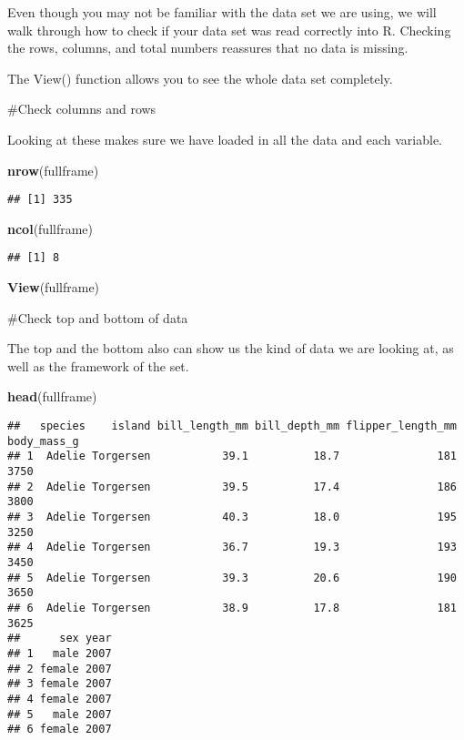 \documentclass[
]{article}
\newenvironment{Shaded}{\begin{snugshade}}{\end{snugshade}}
\newcommand{\FunctionTok}[1]{\textcolor[rgb]{0.13,0.29,0.53}{\textbf{#1}}}
\newcommand{\NormalTok}[1]{#1}
\begin{document}
Even though you may not be familiar with the data set we are using, we
will walk through how to check if your data set was read correctly into
R. Checking the rows, columns, and total numbers reassures that no data
is missing.

The View() function allows you to see the whole data set completely.

\#Check columns and rows

Looking at these makes sure we have loaded in all the data and each
variable.

\begin{Shaded}
\begin{Highlighting}[]
\FunctionTok{nrow}\NormalTok{(fullframe)}
\end{Highlighting}
\end{Shaded}

\begin{verbatim}
## [1] 335
\end{verbatim}

\begin{Shaded}
\begin{Highlighting}[]
\FunctionTok{ncol}\NormalTok{(fullframe)}
\end{Highlighting}
\end{Shaded}

\begin{verbatim}
## [1] 8
\end{verbatim}

\begin{Shaded}
\begin{Highlighting}[]
\FunctionTok{View}\NormalTok{(fullframe)}
\end{Highlighting}
\end{Shaded}

\#Check top and bottom of data

The top and the bottom also can show us the kind of data we are looking
at, as well as the framework of the set.

\begin{Shaded}
\begin{Highlighting}[]
\FunctionTok{head}\NormalTok{(fullframe)}
\end{Highlighting}
\end{Shaded}

\begin{verbatim}
##   species    island bill_length_mm bill_depth_mm flipper_length_mm body_mass_g
## 1  Adelie Torgersen           39.1          18.7               181        3750
## 2  Adelie Torgersen           39.5          17.4               186        3800
## 3  Adelie Torgersen           40.3          18.0               195        3250
## 4  Adelie Torgersen           36.7          19.3               193        3450
## 5  Adelie Torgersen           39.3          20.6               190        3650
## 6  Adelie Torgersen           38.9          17.8               181        3625
##      sex year
## 1   male 2007
## 2 female 2007
## 3 female 2007
## 4 female 2007
## 5   male 2007
## 6 female 2007
\end{verbatim}
\end{document}
